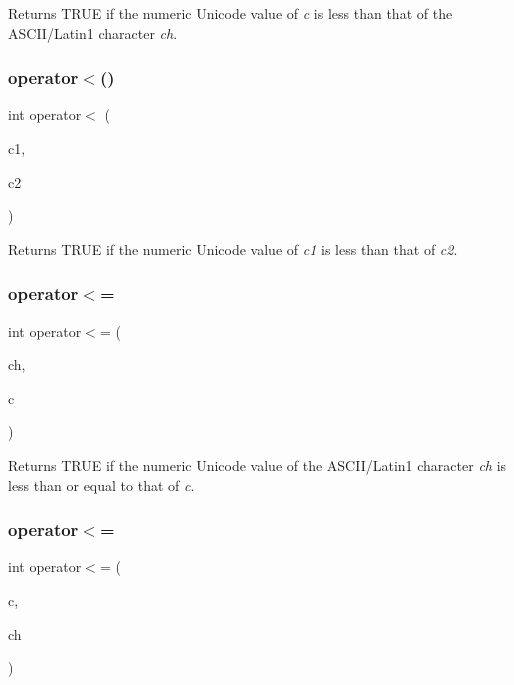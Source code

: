 Returns T\+R\+UE if the numeric Unicode value of {\itshape c} is less than that of the A\+S\+C\+I\+I/\+Latin1 character {\itshape ch}. \mbox{\label{class_q_char_a15002b2e206a26c172b93257b8502dd5}} 
\subsubsection{\texorpdfstring{operator$<$()}{operator<()}\hspace{0.1cm}{\footnotesize\ttfamily [3/3]}}
{\footnotesize\ttfamily int operator$<$ (\begin{DoxyParamCaption}\item[{\mbox{\hyperlink{class_q_char}{Q\+Char}}}]{c1,  }\item[{\mbox{\hyperlink{class_q_char}{Q\+Char}}}]{c2 }\end{DoxyParamCaption})\hspace{0.3cm}{\ttfamily [related]}}

Returns T\+R\+UE if the numeric Unicode value of {\itshape c1} is less than that of {\itshape c2}. \mbox{\label{class_q_char_a93bcb6e42c1ed37d592b901d55f20449}} 
\subsubsection{\texorpdfstring{operator$<$=}{operator<=}\hspace{0.1cm}{\footnotesize\ttfamily [1/3]}}
{\footnotesize\ttfamily int operator$<$= (\begin{DoxyParamCaption}\item[{char}]{ch,  }\item[{\mbox{\hyperlink{class_q_char}{Q\+Char}}}]{c }\end{DoxyParamCaption})\hspace{0.3cm}{\ttfamily [friend]}}

Returns T\+R\+UE if the numeric Unicode value of the A\+S\+C\+I\+I/\+Latin1 character {\itshape ch} is less than or equal to that of {\itshape c}. \mbox{\label{class_q_char_a509b164e80d1625ab984e0ed147c31c6}} 
\subsubsection{\texorpdfstring{operator$<$=}{operator<=}\hspace{0.1cm}{\footnotesize\ttfamily [2/3]}}
{\footnotesize\ttfamily int operator$<$= (\begin{DoxyParamCaption}\item[{\mbox{\hyperlink{class_q_char}{Q\+Char}}}]{c,  }\item[{char}]{ch }\end{DoxyParamCaption})\hspace{0.3cm}{\ttfamily [friend]}}

